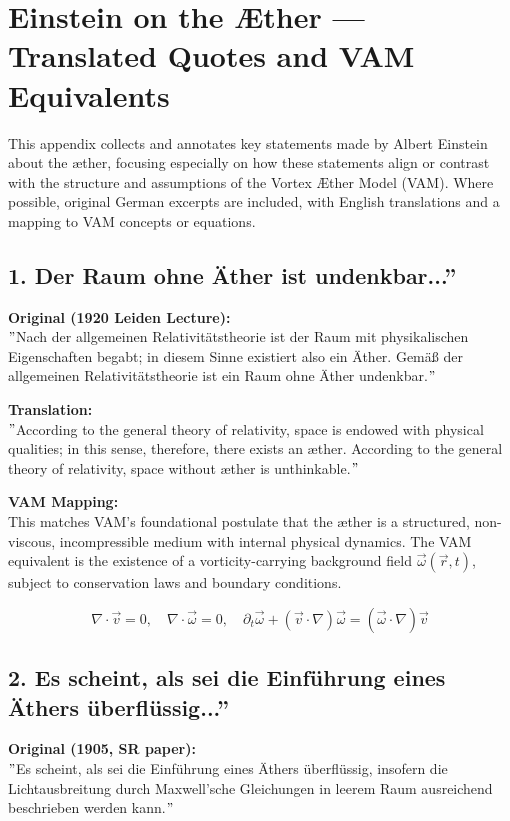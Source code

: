 \section{Einstein on the Æther — Translated Quotes and VAM Equivalents}

    This appendix collects and annotates key statements made by Albert Einstein about the æther, focusing especially on how these statements align or contrast with the structure and assumptions of the Vortex Æther Model (VAM). Where possible, original German excerpts are included, with English translations and a mapping to VAM concepts or equations.

    \subsection*{1. \grqq Der Raum ohne Äther ist undenkbar...\textquotedblright}
    \textbf{Original (1920 Leiden Lecture):} \\
    \("\)Nach der allgemeinen Relativitätstheorie ist der Raum mit physikalischen Eigenschaften begabt; in diesem Sinne existiert also ein Äther. Gemäß der allgemeinen Relativitätstheorie ist ein Raum ohne Äther undenkbar.\("\)

    \textbf{Translation:} \\
    \("\)According to the general theory of relativity, space is endowed with physical qualities; in this sense, therefore, there exists an æther. According to the general theory of relativity, space without æther is unthinkable.\("\)

    \textbf{VAM Mapping:} \\
    This matches VAM's foundational postulate that the æther is a structured, non-viscous, incompressible medium with internal physical dynamics. The VAM equivalent is the existence of a vorticity-carrying background field \( \vec{\omega}(\vec{r}, t) \), subject to conservation laws and boundary conditions.

    \[
    \nabla \cdot \vec{v} = 0, \quad \nabla \cdot \vec{\omega} = 0, \quad \partial_t \vec{\omega} + (\vec{v} \cdot \nabla) \vec{\omega} = (\vec{\omega} \cdot \nabla) \vec{v}
    \]

    \subsection*{2. \grqq Es scheint, als sei die Einführung eines Äthers überflüssig...\textquotedblright}
    \textbf{Original (1905, SR paper):} \\
    \("\)Es scheint, als sei die Einführung eines Äthers überflüssig, insofern die Lichtausbreitung durch Maxwell'sche Gleichungen in leerem Raum ausreichend beschrieben werden kann.\("\)

